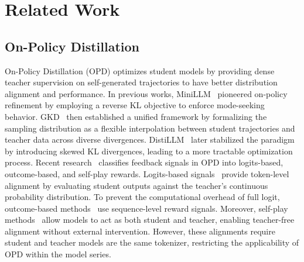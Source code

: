 \documentclass{article}
\theoremstyle{plain}
\theoremstyle{definition}
\theoremstyle{remark}
\begin{document}
\section{Related Work}
\subsection{On-Policy Distillation} 
On-Policy Distillation (OPD) optimizes student models by providing dense teacher supervision on self-generated trajectories to have better distribution alignment and performance. In previous works, MiniLLM~\cite{gu2026minillmonpolicydistillationlarge} pioneered on-policy refinement by employing a reverse KL objective to enforce mode-seeking behavior. GKD~\cite{agarwal2024onpolicydistillationlanguagemodels} then established a unified framework by formalizing the sampling distribution as a flexible interpolation between student trajectories and teacher data across diverse divergences. DistiLLM~\cite{ko2024distillmstreamlineddistillationlarge} later stabilized the paradigm by introducing skewed KL divergences, leading to a more tractable optimization process.
Recent research~\cite{song2026surveyonpolicydistillationlarge} classifies feedback signals in OPD into logits-based, outcome-based, and self-play rewards. Logits-based signals~\cite{jung2025toditokenwisedistillationfinegrained,xu2026paceddistillationonpolicyselfdistillation} provide token-level alignment by evaluating student outputs against the teacher's continuous probability distribution. To prevent the computational overhead of full logit, outcome-based methods~\cite{xu2025kdrlposttrainingreasoningllms,zhang2025aligndistiltokenlevellanguagemodel} use sequence-level reward signals. Moreover, self-play methods~\cite{chen2024selfplayfinetuningconvertsweak,zhao2026selfdistilledreasoneronpolicyselfdistillation} allow models to act as both student and teacher, enabling teacher-free alignment without external intervention.
However, these alignments require student and teacher models are the same tokenizer, restricting the applicability of OPD within the model series.
\end{document}
